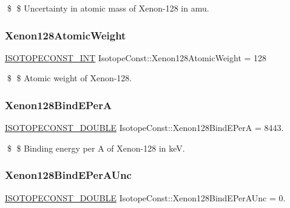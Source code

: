 \$ \$ Uncertainty in atomic mass of Xenon-\/128 in amu. \mbox{\label{group___isotope_const-_xenon-_xe128_ga8f53618679307e24c7c71cb7f596b9c2}} 
\subsubsection{\texorpdfstring{Xenon128\+Atomic\+Weight}{Xenon128AtomicWeight}}
{\footnotesize\ttfamily \mbox{\hyperlink{group___isotope_const-_macros_ga5f18360b3e99483a35c32d789e62621c}{I\+S\+O\+T\+O\+P\+E\+C\+O\+N\+S\+T\+\_\+\+I\+NT}} Isotope\+Const\+::\+Xenon128\+Atomic\+Weight = 128}

\$ \$ Atomic weight of Xenon-\/128. \mbox{\label{group___isotope_const-_xenon-_xe128_ga51ef18d422ada2c87b481d586a97e523}} 
\subsubsection{\texorpdfstring{Xenon128\+Bind\+E\+PerA}{Xenon128BindEPerA}}
{\footnotesize\ttfamily \mbox{\hyperlink{group___isotope_const-_macros_ga8f45a7272ce02c0b4c65c44636ed719a}{I\+S\+O\+T\+O\+P\+E\+C\+O\+N\+S\+T\+\_\+\+D\+O\+U\+B\+LE}} Isotope\+Const\+::\+Xenon128\+Bind\+E\+PerA = 8443.}

\$ \$ Binding energy per A of Xenon-\/128 in keV. \mbox{\label{group___isotope_const-_xenon-_xe128_gad0cec2fb18bb4edf586cf5a529f4f18a}} 
\subsubsection{\texorpdfstring{Xenon128\+Bind\+E\+Per\+A\+Unc}{Xenon128BindEPerAUnc}}
{\footnotesize\ttfamily \mbox{\hyperlink{group___isotope_const-_macros_ga8f45a7272ce02c0b4c65c44636ed719a}{I\+S\+O\+T\+O\+P\+E\+C\+O\+N\+S\+T\+\_\+\+D\+O\+U\+B\+LE}} Isotope\+Const\+::\+Xenon128\+Bind\+E\+Per\+A\+Unc = 0.}

